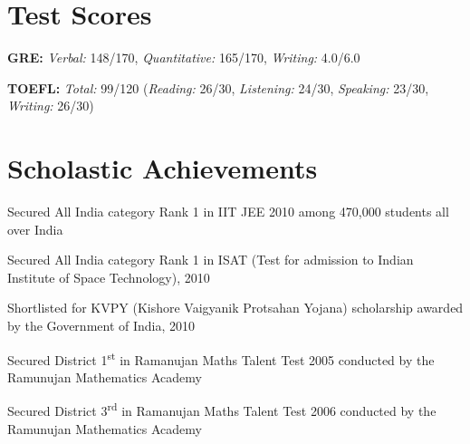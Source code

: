 \documentclass[margin,line]{resume}
\begin{document}
\begin{resume}
    

\section{\mysidestyle Test Scores}
\begin{list1}  
\item \textbf{GRE:} \textit{Verbal:} 148/170, \textit{Quantitative:} 165/170, \textit{Writing:} 4.0/6.0
\item \textbf{TOEFL:} \textit{Total:} 99/120 (\textit{Reading:} 26/30, \textit{Listening:} 24/30, \textit{Speaking:} 23/30, \textit{Writing:} 26/30)
\end{list1}


\section{\mysidestyle Scholastic Achievements}
\begin{list1}
\item Secured All India category Rank 1 in IIT JEE 2010 among 470,000 students all over India
\item Secured All India category Rank 1 in ISAT (Test for admission to Indian Institute of Space Technology), 2010
\item Shortlisted for KVPY (Kishore Vaigyanik Protsahan Yojana) scholarship awarded by the Government of India, 2010
\item Secured District 1\textsuperscript{st} in Ramanujan Maths Talent Test 2005 conducted by the Ramunujan Mathematics Academy
\item Secured District 3\textsuperscript{rd} in Ramanujan Maths Talent Test 2006 conducted by the Ramunujan Mathematics Academy
\end{list1}




\end{resume}
\end{document}
